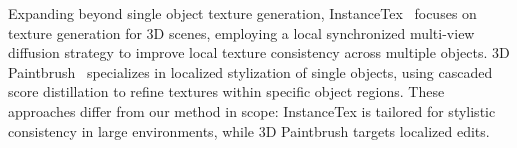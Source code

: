 Expanding beyond single object texture generation, 
InstanceTex~\cite{Yang:2024:Instancetex} focuses on texture generation for 3D scenes, employing a local synchronized multi-view diffusion strategy to improve local texture consistency across multiple objects. 
3D Paintbrush~\cite{Cecatur:2024:Paintbrush} 
 specializes in localized stylization of single objects, using cascaded score distillation to refine textures within specific object regions. These approaches differ from our 
method in scope: InstanceTex is tailored for stylistic consistency in large environments, while 3D Paintbrush targets localized edits.